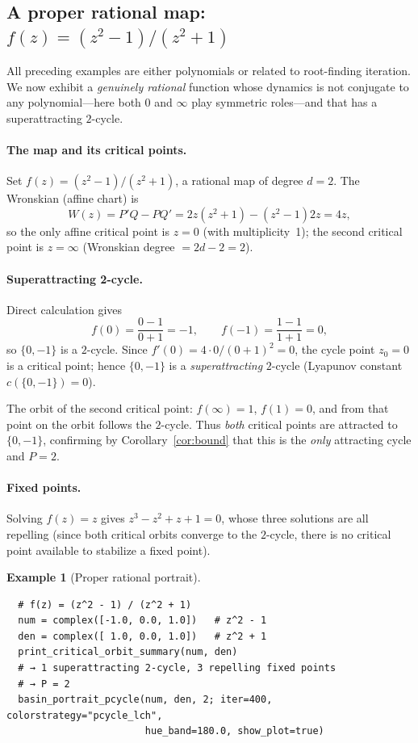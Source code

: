 \documentclass[12pt]{article}
\theoremstyle{definition}
\newtheorem{example}[theorem]{Example}
\begin{document}
\subsection{A proper rational map: $f(z)=(z^2-1)/(z^2+1)$}
\label{subsec:rational}

All preceding examples are either polynomials or related to root-finding
iteration.  We now exhibit a \emph{genuinely rational} function whose
dynamics is not conjugate to any polynomial---here both $0$ and $\infty$
play symmetric roles---and that has a superattracting $2$-cycle.

\paragraph{The map and its critical points.}
Set $f(z)=(z^2-1)/(z^2+1)$, a rational map of degree $d=2$.
The Wronskian (affine chart) is
\[
  W(z) = P'Q - PQ' = 2z(z^2+1) - (z^2-1)2z = 4z,
\]
so the only affine critical point is $z=0$ (with multiplicity~1); the
second critical point is $z=\infty$ (Wronskian degree $=2d-2=2$). 

\paragraph{Superattracting 2-cycle.}
Direct calculation gives
\[
  f(0) = \frac{0-1}{0+1} = -1, \qquad f(-1) = \frac{1-1}{1+1} = 0,
\]
so $\{0,-1\}$ is a $2$-cycle.  Since $f'(0)=4\cdot 0/(0+1)^2=0$, the
cycle point $z_0=0$ is a critical point; hence $\{0,-1\}$ is a
\emph{superattracting} $2$-cycle (Lyapunov constant $c(\{0,-1\})=0$).

The orbit of the second critical point: $f(\infty)=1$, $f(1)=0$, and
from that point on the orbit follows the $2$-cycle.  Thus \emph{both}
critical points are attracted to $\{0,-1\}$, confirming by
Corollary~\ref{cor:bound} that this is the \emph{only} attracting cycle
and $P=2$.

\paragraph{Fixed points.}
Solving $f(z)=z$ gives $z^3-z^2+z+1=0$, whose three solutions are all
repelling (since both critical orbits converge to the $2$-cycle, there
is no critical point available to stabilize a fixed point).

\begin{example}[Proper rational portrait]
\begin{verbatim}
  # f(z) = (z^2 - 1) / (z^2 + 1)
  num = complex([-1.0, 0.0, 1.0])   # z^2 - 1
  den = complex([ 1.0, 0.0, 1.0])   # z^2 + 1
  print_critical_orbit_summary(num, den)
  # → 1 superattracting 2-cycle, 3 repelling fixed points
  # → P = 2
  basin_portrait_pcycle(num, den, 2; iter=400, colorstrategy="pcycle_lch",
                        hue_band=180.0, show_plot=true)
\end{verbatim}
\end{example}
\end{document}
